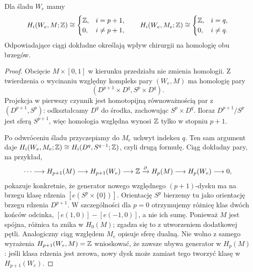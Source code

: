 \begin{twierdzenie}
\label{thm:homologia-sladu-21}
Dla śladu $W_e$ mamy
\[
 H_i(W_e,M;\mathbb{Z})\cong
 \begin{cases}\mathbb{Z},&i=p+1,\\0,&i\ne p+1,
 \end{cases}
 \qquad
 H_i(W_e,M_e;\mathbb{Z})\cong
 \begin{cases}\mathbb{Z},&i=q,\\0,&i\ne q.
 \end{cases}
\]
Odpowiadające ciągi dokładne określają wpływ
chirurgii na homologię obu brzegów.
\end{twierdzenie}
\begin{proof}
Obcięcie $M\times[0,1]$ w kierunku przedziału
nie zmienia homologii. Z twierdzenia o wycinaniu
względny kompleks pary $(W_e,M)$ ma homologię
pary
\[
 (D^{p+1}\times D^q,S^p\times D^q).
\]
Projekcja w pierwszy czynnik jest homotopijną
równoważnością par z $(D^{p+1},S^p)$:
odkształcamy $D^q$ do środka, zachowując
$S^p\times D^q$. Iloraz $D^{p+1}/S^p$
jest sferą $S^{p+1}$, więc homologia względna
wynosi $\mathbb{Z}$ tylko w stopniu $p+1$.

Po odwróceniu śladu przyczepiamy do $M_e$
uchwyt indeksu $q$. Ten sam argument daje
$H_i(W_e,M_e;\mathbb{Z})\cong H_i(D^q,S^{q-1};\mathbb{Z})$,
czyli drugą formułę.
Ciąg dokładny pary, na przykład,
\[
 \cdots\longrightarrow H_{p+1}(M)
 \longrightarrow H_{p+1}(W_e)
 \longrightarrow\mathbb{Z}\xrightarrow{\partial}
 H_p(M)\longrightarrow H_p(W_e)
 \longrightarrow0,
\]
pokazuje konkretnie, że generator nowego
względnego $(p+1)$-dysku ma na brzegu klasę
rdzenia $[e(S^p\times\{0\})]$.
Orientację $S^p$ bierzemy tu jako orientację brzegu
rdzenia $D^{p+1}$. W szczególności dla $p=0$ otrzymujemy
różnicę klas dwóch końców odcinka, $[e(1,0)]-[e(-1,0)]$,
a nie ich sumę. Ponieważ $M$ jest spójna, różnica ta
znika w $H_0(M)$; zgadza się to z utworzeniem dodatkowej pętli.
Analogiczny ciąg względem $M_e$ opisuje
sferę dualną. Nie wolno z samego wyrażenia
$H_{p+1}(W_e,M)=\mathbb{Z}$ wnioskować, że zawsze
ubywa generator w $H_p(M)$: jeśli klasa rdzenia
jest zerowa, nowy dysk może zamiast tego
tworzyć klasę w $H_{p+1}(W_e)$.
\end{proof}

